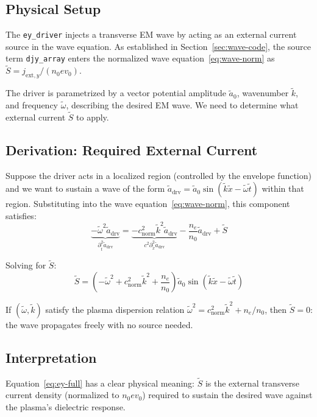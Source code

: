 \documentclass[11pt]{article}
\newcommand{\tl}[1]{\tilde{#1}}
\newcommand{\cnorm}{c_{\text{norm}}}
\newcommand{\code}[1]{\texttt{#1}}
\begin{document}
\subsection{Physical Setup}

The \code{ey\_driver} injects a transverse EM wave by acting as an external current source in the wave equation. As established in Section~\ref{sec:wave-code}, the source term \code{djy\_array} enters the normalized wave equation~\eqref{eq:wave-norm} as $\tl{S} = j_{\text{ext},y}/(n_0 e v_0)$.

The driver is parametrized by a vector potential amplitude $\tl{a}_0$, wavenumber $\tl{k}$, and frequency $\tl{\omega}$, describing the desired EM wave. We need to determine what external current $\tl{S}$ to apply.

\subsection{Derivation: Required External Current}

Suppose the driver acts in a localized region (controlled by the envelope function) and we want to sustain a wave of the form $\tl{a}_{\text{drv}} = \tl{a}_0 \sin(\tl{k}\tl{x} - \tl{\omega}\tl{t})$ within that region. Substituting into the wave equation~\eqref{eq:wave-norm}, this component satisfies:
\begin{equation}
    \underbrace{-\tl{\omega}^2 \tl{a}_{\text{drv}}}_{\partial^2_{\tl{t}}\tl{a}_{\text{drv}}}
    = \underbrace{-\cnorm^2 \tl{k}^2 \tl{a}_{\text{drv}}}_{c^2\partial^2_{\tl{x}}\tl{a}_{\text{drv}}}
    - \frac{n_e}{n_0}\tl{a}_{\text{drv}}
    + \tl{S}
\end{equation}

Solving for $\tl{S}$:
\begin{equation}
    \tl{S} = \left(-\tl{\omega}^2 + \cnorm^2 \tl{k}^2 + \frac{n_e}{n_0}\right) \tl{a}_0 \sin(\tl{k}\tl{x} - \tl{\omega}\tl{t})
    \label{eq:ey-full}
\end{equation}

If $(\tl{\omega}, \tl{k})$ satisfy the plasma dispersion relation $\tl{\omega}^2 = \cnorm^2 \tl{k}^2 + n_e/n_0$, then $\tl{S} = 0$: the wave propagates freely with no source needed.

\subsection{Interpretation}

Equation~\eqref{eq:ey-full} has a clear physical meaning: $\tl{S}$ is the external transverse current density (normalized to $n_0 e v_0$) required to sustain the desired wave against the plasma's dielectric response.
\end{document}
